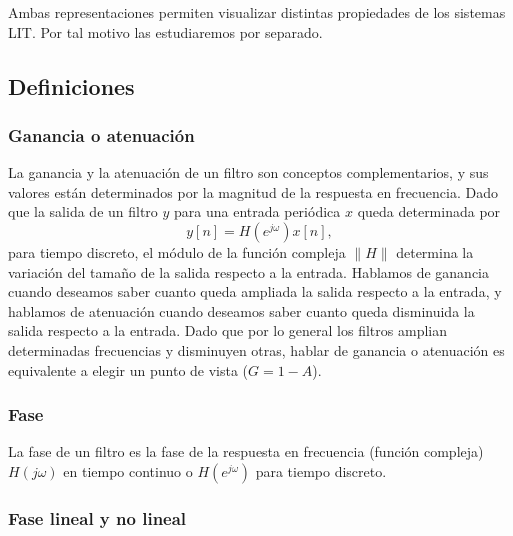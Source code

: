 Ambas representaciones permiten visualizar distintas propiedades de los sistemas LIT. Por tal motivo las
estudiaremos por separado.

\subsection{Definiciones}

\subsubsection{Ganancia o atenuaci\'{o}n}

La ganancia y la atenuaci\'{o}n de un filtro son conceptos complementarios, y sus valores est\'{a}n 
determinados por la magnitud de la respuesta en frecuencia. Dado que la salida de un filtro $y$ para
una entrada peri\'{o}dica $x$ queda determinada por 
\begin{equation}
        y[n] = H(e^{j \omega}) x[n],
\end{equation}
para tiempo discreto, el m\'{o}dulo de la funci\'{o}n compleja $\parallel H \parallel$ determina la 
variaci\'{o}n del tama\~{n}o de la salida respecto a la entrada. Hablamos de ganancia cuando deseamos 
saber cuanto queda ampliada la salida respecto a la entrada, y hablamos de atenuaci\'{o}n cuando deseamos 
saber cuanto queda disminuida la salida respecto a la entrada. Dado que por lo general
los filtros amplian determinadas frecuencias y disminuyen otras, hablar de ganancia o atenuaci\'{o}n es 
equivalente a elegir un punto de vista ($G = 1 - A$).

\subsubsection{Fase}

La fase de un filtro es la fase de la respuesta en frecuencia (funci\'{o}n compleja) $H(j \omega)$ en 
tiempo continuo o $H(e^{j \omega})$ para tiempo discreto.

\subsubsection{Fase lineal y no lineal}

